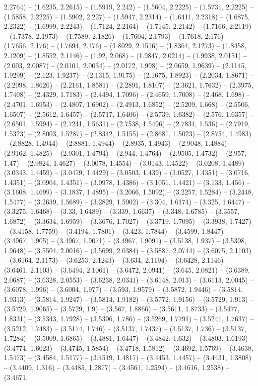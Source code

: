2.2764) -- (1.6235, 2.2615) -- (1.5919, 2.242) -- (1.5604, 2.2225) -- (1.5731, 2.2225) -- (1.5858, 2.2225) -- (1.5902, 2.227) -- (1.5947, 2.2314) -- (1.6411, 2.2318) -- (1.6875, 2.2322) -- (1.6999, 2.2243) -- (1.7124, 2.2164) -- (1.7145, 2.2142) -- (1.7166, 2.2119) -- (1.7378, 2.1973) -- (1.7589, 2.1826) -- (1.7604, 2.1793) -- (1.7618, 2.176) -- (1.7656, 2.176) -- (1.7694, 2.176) -- (1.8029, 2.1516) -- (1.8364, 2.1273) -- (1.8458, 2.1209) -- (1.8552, 2.1146) -- (1.92, 2.068) -- (1.9847, 2.0214) -- (1.9938, 2.0151) -- (2.003, 2.0087) -- (2.0101, 2.0034) -- (2.0172, 1.998) -- (2.0659, 1.9639) -- (2.1145, 1.9299) -- (2.123, 1.9237) -- (2.1315, 1.9175) -- (2.1675, 1.8923) -- (2.2034, 1.8671) -- (2.2098, 1.8626) -- (2.2161, 1.8581) -- (2.2891, 1.8107) -- (2.3621, 1.7632) -- (2.3975, 1.7408) -- (2.4329, 1.7183) -- (2.4494, 1.7096) -- (2.4659, 1.7008) -- (2.468, 1.698) -- (2.4701, 1.6953) -- (2.4807, 1.6902) -- (2.4913, 1.6852) -- (2.5209, 1.668) -- (2.5506, 1.6507) -- (2.5612, 1.6457) -- (2.5717, 1.6406) -- (2.5739, 1.6382) -- (2.576, 1.6357) -- (2.6501, 1.5994) -- (2.7241, 1.5631) -- (2.7538, 1.5496) -- (2.7834, 1.536) -- (2.7919, 1.5323) -- (2.8003, 1.5287) -- (2.8342, 1.5155) -- (2.8681, 1.5023) -- (2.8754, 1.4983) -- (2.8828, 1.4944) -- (2.8881, 1.4944) -- (2.8935, 1.4943) -- (2.9048, 1.4884) -- (2.9162, 1.4825) -- (2.9301, 1.4794) -- (2.944, 1.4764) -- (2.9505, 1.4732) -- (2.957, 1.47) -- (2.9824, 1.4627) -- (3.0078, 1.4554) -- (3.0143, 1.4522) -- (3.0208, 1.4489) -- (3.0343, 1.4459) -- (3.0479, 1.4429) -- (3.0503, 1.439) -- (3.0527, 1.4351) -- (3.0716, 1.4351) -- (3.0904, 1.4351) -- (3.0978, 1.4386) -- (3.1051, 1.4421) -- (3.133, 1.456) -- (3.1608, 1.4699) -- (3.1837, 1.4895) -- (3.2066, 1.5092) -- (3.2257, 1.5284) -- (3.2448, 1.5477) -- (3.2639, 1.5689) -- (3.2829, 1.5902) -- (3.304, 1.6174) -- (3.325, 1.6447) -- (3.3275, 1.6468) -- (3.33, 1.6489) -- (3.339, 1.6637) -- (3.348, 1.6785) -- (3.3557, 1.6872) -- (3.3634, 1.6959) -- (3.3676, 1.7027) -- (3.3719, 1.7095) -- (3.3938, 1.7427) -- (3.4158, 1.7759) -- (3.4194, 1.7801) -- (3.423, 1.7844) -- (3.4599, 1.8447) -- (3.4967, 1.905) -- (3.4967, 1.9071) -- (3.4967, 1.9091) -- (3.5138, 1.937) -- (3.5308, 1.9648) -- (3.5504, 2.0016) -- (3.5699, 2.0384) -- (3.5887, 2.0744) -- (3.6075, 2.1103) -- (3.6164, 2.1173) -- (3.6253, 2.1243) -- (3.634, 2.1194) -- (3.6428, 2.1146) -- (3.6461, 2.1103) -- (3.6494, 2.1061) -- (3.6472, 2.0941) -- (3.645, 2.0821) -- (3.6389, 2.0687) -- (3.6328, 2.0553) -- (3.6238, 2.0341) -- (3.6148, 2.013) -- (3.6113, 2.0045) -- (3.6078, 1.996) -- (3.6004, 1.977) -- (3.593, 1.9579) -- (3.5872, 1.9446) -- (3.5814, 1.9313) -- (3.5814, 1.9247) -- (3.5814, 1.9182) -- (3.5772, 1.9156) -- (3.5729, 1.913) -- (3.5729, 1.9065) -- (3.5729, 1.9) -- (3.567, 1.8866) -- (3.5611, 1.8733) -- (3.5477, 1.8331) -- (3.5343, 1.7928) -- (3.5306, 1.786) -- (3.5269, 1.7791) -- (3.5241, 1.7637) -- (3.5212, 1.7483) -- (3.5174, 1.746) -- (3.5137, 1.7437) -- (3.5137, 1.736) -- (3.5137, 1.7284) -- (3.5009, 1.6865) -- (3.4881, 1.6447) -- (3.4842, 1.632) -- (3.4803, 1.6193) -- (3.4774, 1.6023) -- (3.4745, 1.5854) -- (3.4718, 1.5812) -- (3.4692, 1.5769) -- (3.4638, 1.5473) -- (3.4584, 1.5177) -- (3.4519, 1.4817) -- (3.4453, 1.4457) -- (3.4431, 1.3808) -- (3.4409, 1.316) -- (3.4485, 1.2877) -- (3.4561, 1.2594) -- (3.4616, 1.2538) -- (3.4671, 